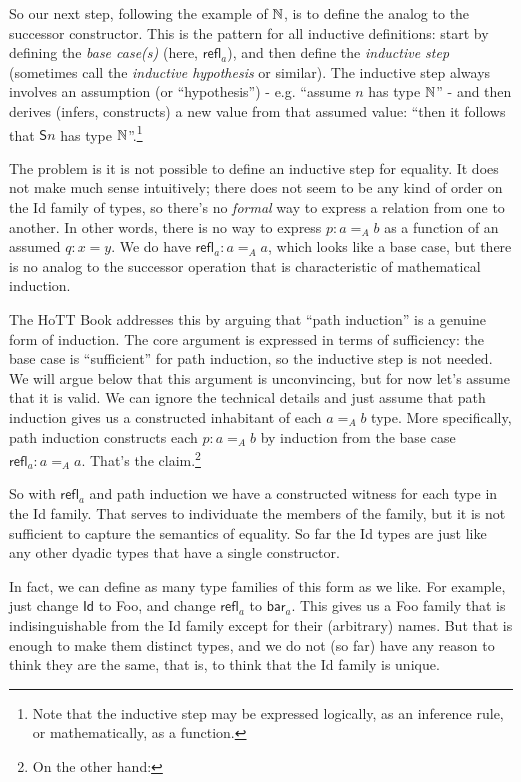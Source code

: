 \documentclass{article}
\begin{document}
So our next step, following the example of \(\mathbb{N}\), is to define the
analog to the successor constructor. This is the pattern for all
inductive definitions: start by defining the \textit{base case(s)}
(here, \(\textsf{refl}_a\)), and then define the \textit{inductive
  step} (sometimes call the \textit{inductive hypothesis} or similar).
The inductive step always involves an assumption (or ``hypothesis'') -
e.g. ``assume \(n\) has type \(\mathbb{N}\)'' - and then derives (infers,
constructs) a new value from that assumed value: ``then it follows
that \(\textsf{S}n\) has type \(\mathbb{N}\)''.\footnote{Note that the
inductive step may be expressed logically, as an inference rule, or
mathematically, as a function.}

The problem is it is not possible to define an inductive step for
equality. It does not make much sense intuitively; there does not seem
to be any kind of order on the \textsf{Id} family of types, so there's
no \textit{formal} way to express a relation from one to another. In
other words, there is no way to express \(p:a=_A b\) as a function of
an assumed \(q:x=y\). We do have \(\textsf{refl}_a:a=_A a\), which
looks like a base case, but there is no analog to the successor
operation that is characteristic of mathematical induction.

The HoTT Book addresses this by arguing that ``path induction'' is a
genuine form of induction. The core argument is expressed in terms of
sufficiency: the base case is ``sufficient'' for path induction, so
the inductive step is not needed. We will argue below that this
argument is unconvincing, but for now let's assume that it is valid.
We can ignore the technical details and just assume that path
induction gives us a constructed inhabitant of each \(a=_A b\) type.
More specifically, path induction constructs each \(p:a=_A b\) by
induction from the base case \(\textsf{refl}_a:a=_A a\). That's the
claim.\footnote{On the other hand: }

So with \(\textsf{refl}_a\) and path induction we have a constructed
witness for each type in the \textsf{Id} family. That serves to
individuate the members of the family, but it is not sufficient to
capture the semantics of equality. So far the \textsf{Id} types are
just like any other dyadic types that have a single constructor.

In fact, we can define as many type families of this form as we like.
For example, just change \(\textsf{Id}\) to \textsf{Foo}, and change
\(\textsf{refl}_a\) to \(\textsf{bar}_a\). This gives us a
\textsf{Foo} family that is indisinguishable from the \textsf{Id}
family except for their (arbitrary) names. But that is enough to make
them distinct types, and we do not (so far) have any reason to think
they are the same, that is, to think that the \textsf{Id} family is
unique.
\end{document}
